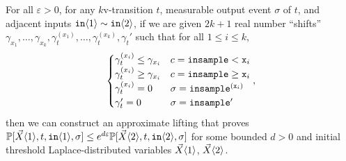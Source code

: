 \begin{lemma}\label{simplifiedMvParallelCouplingsLemma}
    For all $\varepsilon>0$, for any $k$v-transition $t$, measurable output event $\sigma$ of $t$, and adjacent inputs $\texttt{in}\brangle{1}\sim\texttt{in}\brangle{2}$, if we are given $2k+1$ real number ``shifts'' $\gamma_{x_1}, \ldots, \gamma_{x_k}, \gamma_t^{(x_1)}, \ldots, \gamma_t^{(x_k)}, \gamma_t'$ such that for all $1\leq i\leq k$, \[
        \begin{cases}
            \gamma_t^{(x_i)}\leq\gamma_{x_i} & c = \lguard[\texttt{x}_i]\\
            \gamma_t^{(x_i)}\geq\gamma_{x_i} & c = \gguard[\texttt{x}_i]\\
            \gamma_t^{(x_i)}=0 & \sigma = \texttt{insample}^{(\texttt{x}_i)}\\
            \gamma_t'=0 & \sigma = \texttt{insample}'
      \end{cases},
      \]
      then we can construct an approximate lifting that proves $\PP[\vec{X}\brangle{1}, t, \texttt{in}\brangle{1}, \sigma]\leq e^{d\varepsilon}\PP[\vec{X}\brangle{2}, t, \texttt{in}\brangle{2}, \sigma]$ for some bounded $d>0$ and initial threshold Laplace-distributed variables $\vec{X}\brangle{1}$, $\vec{X}\brangle{2}$. 
\end{lemma}


